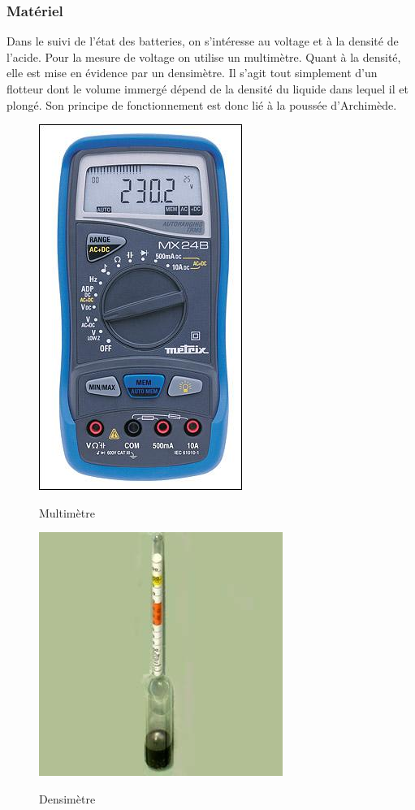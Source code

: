 \subsubsection{Matériel}
Dans le suivi de l'état des batteries, on s'intéresse au voltage et à la densité de l'acide.
Pour la mesure de voltage on utilise un multimètre.
Quant à la densité, elle est mise en évidence par un densimètre. Il s'agit tout simplement d'un flotteur dont le volume immergé dépend de la densité  du liquide dans lequel il et plongé. 
Son principe de fonctionnement est donc lié à la poussée d'Archimède. 
\begin{figure}[h]

  \begin{minipage}[ht]{7cm}
        \centering
	\includegraphics[scale=0.4]{./Figures/multimetre.jpg}
		\label{fig:Multimere}
		\caption{Multimètre}
    \end{minipage}
    \begin{minipage}[ht]{8cm}
        \centering
\includegraphics[scale=01]{./Figures/densimetre.jpg}

	\label{fig:Densimetre}
			\caption{Densimètre}

    \end{minipage}
\end{figure}

